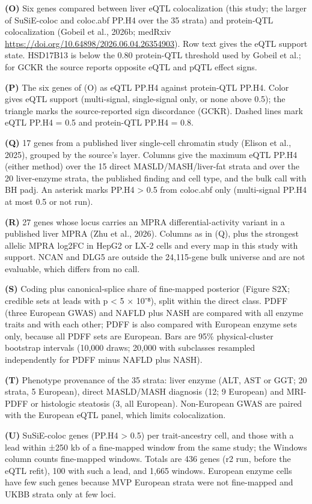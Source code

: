 \textbf{(O)} Six genes compared between liver eQTL colocalization (this study; the larger of SuSiE-coloc and coloc.abf PP.H4 over the 35 strata) and protein-QTL colocalization (Gobeil et al., 2026b; medRxiv \url{https://doi.org/10.64898/2026.06.04.26354903}). Row text gives the eQTL support state. HSD17B13 is below the 0.80 protein-QTL threshold used by Gobeil et al.; for GCKR the source reports opposite eQTL and pQTL effect signs.

\textbf{(P)} The six genes of (O) as eQTL PP.H4 against protein-QTL PP.H4. Color gives eQTL support (multi-signal, single-signal only, or none above 0.5); the triangle marks the source-reported sign discordance (GCKR). Dashed lines mark eQTL PP.H4 = 0.5 and protein-QTL PP.H4 = 0.8.

\textbf{(Q)} 17 genes from a published liver single-cell chromatin study (Elison et al., 2025), grouped by the source's layer. Columns give the maximum eQTL PP.H4 (either method) over the 15 direct MASLD/MASH/liver-fat strata and over the 20 liver-enzyme strata, the published finding and cell type, and the bulk call with BH padj. An asterisk marks PP.H4 \textgreater{} 0.5 from coloc.abf only (multi-signal PP.H4 at most 0.5 or not run).

\textbf{(R)} 27 genes whose locus carries an MPRA differential-activity variant in a published liver MPRA (Zhu et al., 2026). Columns as in (Q), plus the strongest allelic MPRA log2FC in HepG2 or LX-2 cells and every map in this study with support. NCAN and DLG5 are outside the 24,115-gene bulk universe and are not evaluable, which differs from no call.

\textbf{(S)} Coding plus canonical-splice share of fine-mapped posterior (Figure S2X; credible sets at leads with p \textless{} 5 × 10⁻⁸), split within the direct class. PDFF (three European GWAS) and NAFLD plus NASH are compared with all enzyme traits and with each other; PDFF is also compared with European enzyme sets only, because all PDFF sets are European. Bars are 95\% physical-cluster bootstrap intervals (10,000 draws; 20,000 with subclasses resampled independently for PDFF minus NAFLD plus NASH).

\textbf{(T)} Phenotype provenance of the 35 strata: liver enzyme (ALT, AST or GGT; 20 strata, 5 European), direct MASLD/MASH diagnosis (12; 9 European) and MRI-PDFF or histologic steatosis (3, all European). Non-European GWAS are paired with the European eQTL panel, which limits colocalization.

\textbf{(U)} SuSiE-coloc genes (PP.H4 \textgreater{} 0.5) per trait-ancestry cell, and those with a lead within ±250 kb of a fine-mapped window from the same study; the Windows column counts fine-mapped windows. Totals are 436 genes (r2 run, before the eQTL refit), 100 with such a lead, and 1,665 windows. European enzyme cells have few such genes because MVP European strata were not fine-mapped and UKBB strata only at few loci.

